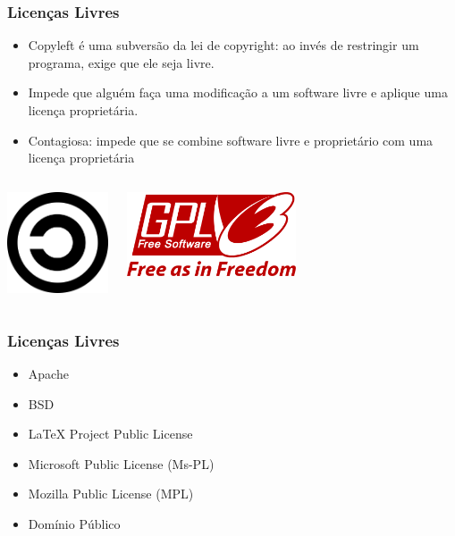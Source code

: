\documentclass{beamer}
\begin{document}
\begin{frame}
   \frametitle{Licenças Livres}
   \begin{itemize}
   \item Copyleft é uma subversão da lei de copyright: ao invés de restringir um programa, exige que ele seja livre.
   \item Impede que alguém faça uma modificação a um software livre e aplique uma licença proprietária.
   \item Contagiosa: impede que se combine software livre e proprietário com uma licença proprietária
   \end{itemize}
   \begin{columns}
     \column{4cm}
     \begin{center}
       \includegraphics[width=3cm]{copyleft.png}
     \end{center}
     \column{7cm}
     \begin{center}
       \includegraphics[width=5cm]{GPLv3_Logo.png}
     \end{center}
 \end{columns}
\end{frame}

\begin{frame}
  \frametitle{Licenças Livres}
  \begin{itemize}
  \item Apache
  \item BSD
  \item LaTeX Project Public License
  \item Microsoft Public License (Ms-PL)
  \item Mozilla Public License (MPL)
  \item Domínio Público
  \end{itemize}
\end{frame}
\end{document}
